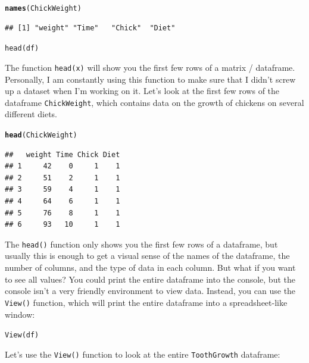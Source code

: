 \documentclass{tufte-book}\usepackage[]{graphicx}\usepackage[]{color}
\makeatletter
\newcommand{\hlstd}[1]{\textcolor[rgb]{0.345,0.345,0.345}{#1}}%
\newcommand{\hlkwd}[1]{\textcolor[rgb]{0.737,0.353,0.396}{\textbf{#1}}}%
\newenvironment{kframe}{%
 \def\at@end@of@kframe{}%
 \ifinner\ifhmode%
  \def\at@end@of@kframe{\end{minipage}}%
  \begin{minipage}{\columnwidth}%
 \fi\fi%
 \def\FrameCommand##1{\hskip\@totalleftmargin \hskip-\fboxsep
 \colorbox{shadecolor}{##1}\hskip-\fboxsep
     \hskip-\linewidth \hskip-\@totalleftmargin \hskip\columnwidth}%
 \MakeFramed {\advance\hsize-\width
   \@totalleftmargin\z@ \linewidth\hsize
   \@setminipage}}%
 {\par\unskip\endMakeFramed%
 \at@end@of@kframe}
\newenvironment{knitrout}{}{} %
\newcommand{\newfun}[1]{\begin{LARGE} \begin{center} \texttt{#1} \end{center} \end{LARGE}}
\makeatother
\begin{document}
\begin{knitrout}
\color{fgcolor}\begin{kframe}
\begin{alltt}
\hlkwd{names}\hlstd{(ChickWeight)}
\end{alltt}
\begin{verbatim}
## [1] "weight" "Time"   "Chick"  "Diet"
\end{verbatim}
\end{kframe}
\end{knitrout}


\newfun{head(df)}

The function \texttt{head(x)} will show you the first few rows of a matrix / dataframe. Personally, I am constantly using this function to make sure that I didn't screw up a dataset when I'm working on it. Let's look at the first few rows of the dataframe \texttt{ChickWeight}, which contains data on the growth of chickens on several different diets.

\begin{knitrout}
\color{fgcolor}\begin{kframe}
\begin{alltt}
\hlkwd{head}\hlstd{(ChickWeight)}
\end{alltt}
\begin{verbatim}
##   weight Time Chick Diet
## 1     42    0     1    1
## 2     51    2     1    1
## 3     59    4     1    1
## 4     64    6     1    1
## 5     76    8     1    1
## 6     93   10     1    1
\end{verbatim}
\end{kframe}
\end{knitrout}

The \texttt{head()} function only shows you the first few rows of a dataframe, but usually this is enough to get a visual sense of the names of the dataframe, the number of columns, and the type of data in each column. But what if you want to see all values? You could print the entire dataframe into the console, but the console isn't a very friendly environment to view data. Instead, you can use the \texttt{View()} function, which will print the entire dataframe into a spreadsheet-like window:

\newfun{View(df)}

Let's use the \texttt{View()} function to look at the entire \texttt{ToothGrowth} dataframe:
\end{document}
